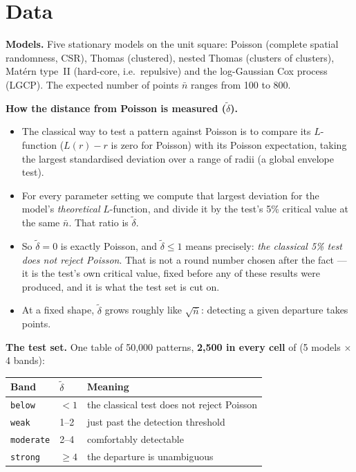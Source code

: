 \documentclass[10pt,a4paper]{article}
\newcommand{\nbar}{\bar n}
\newcommand{\dtil}{\tilde\delta}
\begin{document}
\section{Data}

\textbf{Models.} Five stationary models on the unit square: Poisson (complete spatial randomness, CSR), Thomas (clustered), nested Thomas (clusters of clusters), Mat\'ern type~II (hard-core, i.e.\ repulsive) and the log-Gaussian Cox process (LGCP). The expected number of points $\nbar$ ranges from 100 to 800.

\textbf{How the distance from Poisson is measured ($\dtil$).}
\begin{itemize}
  \item The classical way to test a pattern against Poisson is to compare its $L$-function ($L(r)-r$ is zero for Poisson) with its Poisson expectation, taking the largest standardised deviation over a range of radii (a global envelope test).
  \item For every parameter setting we compute that largest deviation for the model's \emph{theoretical} $L$-function, and divide it by the test's 5\% critical value at the same $\nbar$. That ratio is $\dtil$.
  \item So $\dtil = 0$ is exactly Poisson, and $\dtil \le 1$ means precisely: \emph{the classical 5\% test does not reject Poisson}. That is not a round number chosen after the fact --- it is the test's own critical value, fixed before any of these results were produced, and it is what the test set is cut on.
  \item At a fixed shape, $\dtil$ grows roughly like $\sqrt{\nbar}$: detecting a given departure takes points.
\end{itemize}

\textbf{The test set.} One table of 50{,}000 patterns, \textbf{2{,}500 in every cell} of (5 models $\times$ 4 bands):

\begin{center}\small
\begin{tabular}{@{}lll@{}}
\toprule
Band & $\dtil$ & Meaning\\
\midrule
\texttt{below}    & $<1$   & the classical test does not reject Poisson\\
\texttt{weak}     & 1--2   & just past the detection threshold\\
\texttt{moderate} & 2--4   & comfortably detectable\\
\texttt{strong}   & $\ge 4$ & the departure is unambiguous\\
\bottomrule
\end{tabular}
\end{center}
\end{document}
